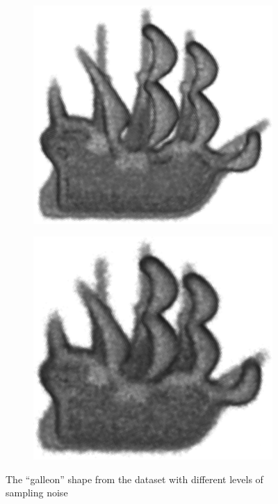 \begin{figure}[ht]
\begin{subfigure}[t]{0.24\linewidth}
		\label{fig/eval/noise_low}
	\end{subfigure}
	\begin{subfigure}[t]{0.24\linewidth}\centering
		\includegraphics[width=1\linewidth]{./fig/eval/noise_mid.png}
		\label{fig/eval/noise_mid}
	\end{subfigure}
	\begin{subfigure}[t]{0.24\linewidth}\centering
		\includegraphics[width=1\linewidth]{./fig/eval/noise_high.png}
		\label{fig/eval/noise_high}
	\end{subfigure}
	\caption{The ``galleon'' shape from the \meshset dataset with different levels of sampling noise}
	\label{fig/eval/noisesample}
\end{figure}

